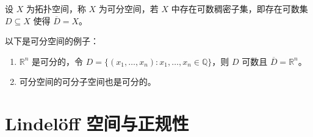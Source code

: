 \documentclass[lang=cn,a4paper,newtx,figureplace=section,tableplace=section]{elegantbook}
\begin{document}
\begin{definition}[可分空间]\label{def:separable-space}
设 $X$ 为拓扑空间，称 $X$ 为可分空间，若 $X$ 中存在可数稠密子集，即存在可数集 $D \subseteq X$ 使得 $\overline{D} = X$。
\end{definition}

\begin{example}
以下是可分空间的例子：
\begin{enumerate}
\item $\mathbb{R}^n$ 是可分的，令 $D = \{(x_1, \ldots, x_n) : x_1, \ldots, x_n \in \mathbb{Q}\}$，则 $D$ 可数且 $\overline{D} = \mathbb{R}^n$。
\item 可分空间的可分子空间也是可分的。
\end{enumerate}
\end{example}

\section{Lindelöff 空间与正规性}
\end{document}
